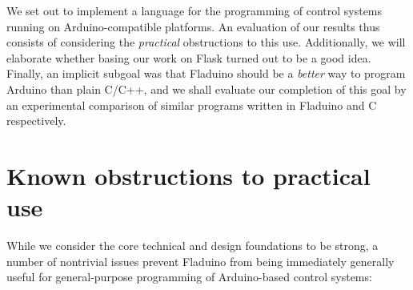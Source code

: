 \documentclass[a4paper, oneside, final]{memoir}
\begin{document}
We set out to implement a language for the programming of control
systems running on Arduino-compatible platforms.  An evaluation of our
results thus consists of considering the \textit{practical}
obstructions to this use.  Additionally, we will elaborate whether
basing our work on Flask turned out to be a good idea.  Finally, an
implicit subgoal was that Fladuino should be a \textit{better} way to
program Arduino than plain C/C++, and we shall evaluate our completion
of this goal by an experimental comparison of similar programs written
in Fladuino and C respectively.

\section{Known obstructions to practical use}

While we consider the core technical and design foundations to be
strong, a number of nontrivial issues prevent Fladuino from being
immediately generally useful for general-purpose programming of
Arduino-based control systems:
\end{document}
